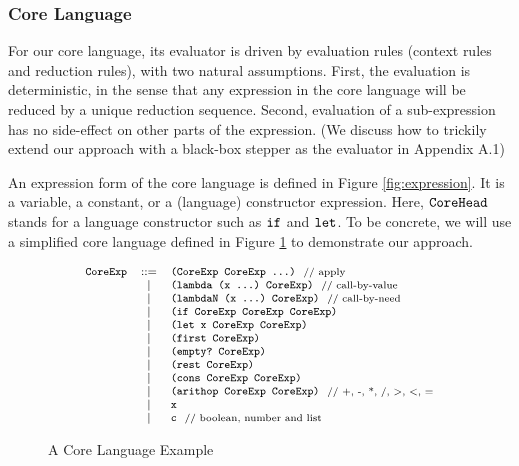 \subsubsection{Core Language}

For our core language,  its evaluator is driven by evaluation rules (context rules and reduction rules), with two natural assumptions. First, the evaluation is deterministic, in the sense that any expression in the core language will be reduced by a unique reduction sequence. Second, evaluation of a sub-expression has no side-effect on other parts of the expression.
(We discuss how to trickily extend our approach with a black-box stepper as the evaluator in Appendix A.1)

An expression form of the core language is defined in Figure \ref{fig:expression}. It is a variable, a constant, or a (language) constructor expression. Here, $\mbox{\tt CoreHead}$ stands for a language constructor such as $\mbox{\tt if}$ and $\mbox{\tt let}$. To be concrete, we will use a simplified core language defined in Figure \ref{fig:core} to demonstrate our approach.

\begin{figure}[thb]
\begin{centering}
	\[
	{\footnotesize
			\begin{array}{lcl}
			\mbox{\tt CoreExp} &::=& \texttt{(CoreExp~CoreExp~...)} ~~\mbox{{\scriptsize // apply}}\\
			&|& \mbox{\tt (lambda~(x~...)~CoreExp)} ~~\mbox{{\scriptsize // call-by-value}}\\
			&|& \mbox{\tt (lambdaN~(x~...)~CoreExp)} ~~\mbox{{\scriptsize // call-by-need}}\\
			&|& \mbox{\tt (if~CoreExp~CoreExp~CoreExp)}\\
			&|& \mbox{\tt (let~x~CoreExp~CoreExp)}\\
			&|& \mbox{\tt (first~CoreExp)}\\
			&|& \mbox{\tt (empty?~CoreExp)}\\
			&|& \mbox{\tt (rest~CoreExp)}\\
			&|& \mbox{\tt (cons~CoreExp~CoreExp)}\\
			&|& \mbox{\tt (arithop~CoreExp~CoreExp)} ~~\mbox{{\scriptsize // +, -, *, /, >, <, =}}\\
			&|& \mbox{\tt x}\\
			&|& \mbox{\tt c} ~~\mbox{{\scriptsize // boolean, number and list}}
			\end{array}
	}
	\]
\end{centering}
\caption{A Core Language Example}
\label{fig:core}
\end{figure}



